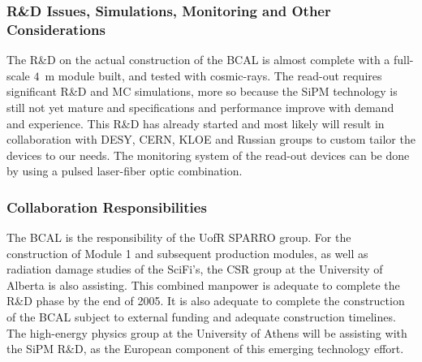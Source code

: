 \subsubsection*{R\&D Issues, Simulations, Monitoring and Other Considerations}
The R\&D on the actual construction of the BCAL is almost complete with
a full-scale $4$~m module built, and tested with cosmic-rays.  The
read-out requires significant R\&D and MC simulations, more so because the SiPM
technology is still not yet mature and specifications and performance improve
with demand and experience.  This R\&D has already started and most likely will
result in collaboration with DESY, CERN, KLOE and Russian groups to custom
tailor the devices to our needs.  The monitoring system of the read-out devices
can be done by using a pulsed laser-fiber optic combination.



\subsubsection*{Collaboration Responsibilities}

The BCAL is the responsibility of the UofR SPARRO group.   For the construction
of Module 1 and subsequent production modules, as well as radiation damage
studies of the SciFi's, the CSR group at the University of Alberta is also
assisting.  This combined manpower is adequate to complete the R\&D phase
by the end of 2005.   It is also adequate to complete the construction of
the BCAL subject to external funding and adequate construction timelines.
The high-energy physics group at the University of Athens will be assisting
with the SiPM R\&D, as the European component of this emerging technology effort.

